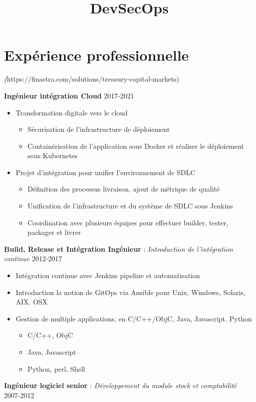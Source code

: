 \documentclass[11pt,a4paper]{moderncv}
\title{DevSecOps}
\begin{document}
\makecvtitle

\section{Expérience professionnelle}


{
\textit(https://finastra.com/solutions/treasury-capital-markets)
\bigskip

\textbf{Ingénieur intégration Cloud} \hfill 2017-2021
\bigskip
	\begin{itemize}%
		\item Transformation digitale vers le cloud
			\begin{itemize}%
				\item Sécurisation de l'infrastructure de déploiement
				\item Containérisation de l'application sous Docker et réaliser le déploiement sous Kubernetes
			\end{itemize}
	\end{itemize}
\bigskip
	\begin{itemize}%
	\item	Projet d’intégration pour unifier l'environnement de SDLC
		\begin{itemize}%
				\item Définition des processus livraison, ajout de métrique de qualité
				\item Unification de l'infrastructure et du système de SDLC sous Jenkins
				\item Coordination avec plusieurs équipes pour effectuer builder, tester, packager  et livrer
		\end{itemize}
	\end{itemize}
\bigskip
 \textbf{Build, Release et Intégration Ingénieur} : \textit{Introduction de l'intégration continue} \hfill 2012-2017
\bigskip
			\begin{itemize}%
				\item Intégration continue avec Jenkins pipeline et automatisation
                \item Introduction la notion de GitOps via Ansible pour Unix, Windows, Solaris, AIX. OSX
				\item Gestion de multiple applications, en C/C++/ObjC, Java, Javascript. Python
					\begin{itemize}
						\item C/C++, ObjC
						\item Java, Javascript
						\item Python, perl, Shell
					\end{itemize}
				\end{itemize}
\bigskip
\textbf{Ingénieur logiciel senior} : \textit{Développement du module stock et comptabilité} \hfill 2007-2012

}
\end{document}
